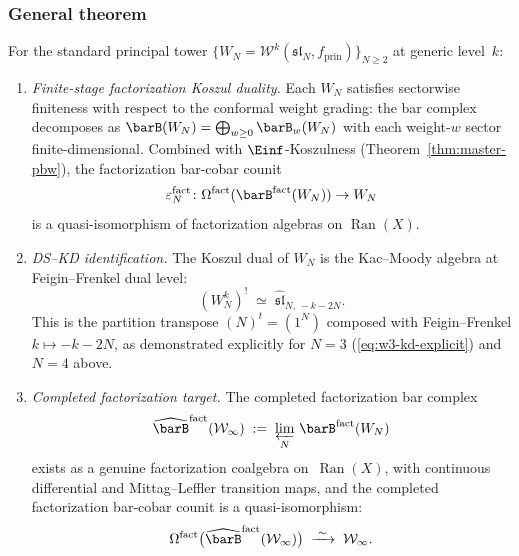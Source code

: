 \subsubsection*{General theorem}

\begin{theorem}
\label{thm:winfty-factorization-kd}
For the standard principal tower
$\{W_N = \mathcal{W}^k(\mathfrak{sl}_N, f_{\mathrm{prin}})\}_{N \ge 2}$
at generic level~$k$:
\begin{enumerate}[label=\textup{(\roman*)}]
\item \emph{Finite-stage factorization Koszul duality.}
  Each $W_N$ satisfies sectorwise finiteness with respect to
  the conformal weight grading: the bar complex decomposes as
  $\barB(W_N) = \bigoplus_{w \ge 0} \barB_w(W_N)$ with each
  weight-$w$ sector finite-dimensional.
  Combined with $\Einf$-Koszulness
  \textup{(}Theorem~\textup{\ref{thm:master-pbw})},
  the factorization bar-cobar counit
  \[
  \varepsilon_N^{\mathrm{fact}}\colon
  \Omega^{\mathrm{fact}}(\barB^{\mathrm{fact}}(W_N)) \to W_N
  \]
  is a quasi-isomorphism of factorization algebras
  on $\operatorname{Ran}(X)$.

\item \emph{DS--KD identification.}
  The Koszul dual of $W_N$ is the Kac--Moody algebra at
  Feigin--Frenkel dual level:
  \begin{equation}\label{eq:winfty-stage-kd}
  (W_N^k)^!
  \;\simeq\;
  \widehat{\mathfrak{sl}}_{N,\,-k-2N}.
  \end{equation}
  This is the partition transpose
  $(N)^t = (1^N)$ composed with Feigin--Frenkel
  $k \mapsto -k - 2N$, as demonstrated explicitly for $N = 3$
  \textup{(\eqref{eq:w3-kd-explicit})} and $N = 4$ above.

\item \emph{Completed factorization target.}
  The completed factorization bar complex
  \[
  \widehat{\barB}^{\mathrm{fact}}(\mathcal{W}_\infty)
  \;:=\;
  \varprojlim_N\, \barB^{\mathrm{fact}}(W_N)
  \]
  exists as a genuine factorization coalgebra
  on~$\operatorname{Ran}(X)$, with continuous differential and
  Mittag--Leffler transition maps, and the completed factorization
  bar-cobar counit is a quasi-isomorphism:
  \[
  \Omega^{\mathrm{fact}}\bigl(
    \widehat{\barB}^{\mathrm{fact}}(\mathcal{W}_\infty)
  \bigr)
  \;\xrightarrow{\;\sim\;}\;
  \mathcal{W}_\infty.
  \]


\end{enumerate}
\end{theorem}
